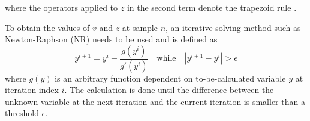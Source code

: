 \documentclass[twoside,a4paper,dvipsnames]{article}
\def\SBcomment[#1]{\textcolor{Red}{#1}}
\def\SWcomment[#1]{\textcolor{Green}{#1}}
\begin{document}
where the operators applied to $z$ in the second term denote the trapezoid rule \cite{Bilbao2009}.

To obtain the values of $v$ and $z$ at sample $n$, an iterative solving method such as Newton-Raphson (NR) needs to be used and is defined as \cite{Wallis1685}
\begin{equation}
    y^{i+1} = y^{i} - \frac{g(y^i)}{g'(y^i)} \quad \text{while} \quad |y^{i+1}-y^i| > \epsilon
\end{equation}
where $g(y)$ is an arbitrary function dependent on to-be-calculated variable $y$ at iteration index $i$. The calculation is done until the difference between the unknown variable at the next iteration and the current iteration is smaller than a threshold $\epsilon$.
\end{document}
